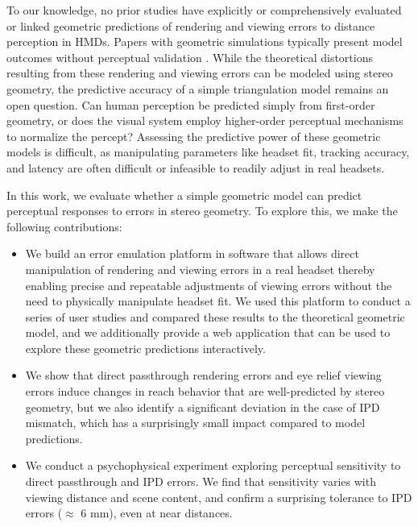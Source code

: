 To our knowledge, no prior studies have explicitly or comprehensively evaluated or linked geometric
predictions of rendering and viewing errors to distance perception in HMDs. Papers with geometric simulations typically present model outcomes without perceptual validation \cite{held2008misperceptions, robinett92, woods93}. While the theoretical distortions resulting from these rendering and viewing errors can be modeled using stereo geometry, the predictive accuracy of a simple triangulation model remains an open question. Can human perception be predicted simply from first-order geometry, or does the visual system employ higher-order perceptual mechanisms to normalize the percept? Assessing the predictive power of these geometric models is difficult, as manipulating parameters like headset fit, tracking accuracy, and latency are often difficult or infeasible to readily adjust in real headsets. 

In this work, we evaluate whether a simple geometric model can predict perceptual responses to errors in stereo geometry. To explore this, we make the following contributions:

\begin{itemize}   
    \item We build an error emulation platform in software that allows direct manipulation of rendering and viewing errors in a real headset thereby enabling precise and repeatable adjustments of viewing errors without the need to physically manipulate headset fit. We used this platform to conduct a series of user studies and compared these results to the theoretical geometric model, and we additionally provide a web application that can be used to explore these geometric predictions interactively.

    \item  We show that direct passthrough rendering errors and eye relief viewing errors induce changes in reach behavior that are well-predicted by stereo geometry, but we also identify a significant deviation in the case of IPD mismatch, which has a surprisingly small impact compared to model predictions.
    
    \item We conduct a psychophysical experiment exploring perceptual sensitivity to direct passthrough and IPD errors. We find that sensitivity varies with viewing distance and scene content, and confirm a surprising tolerance to IPD errors ($\approx$ 6 mm), even at near distances.
    
    
\end{itemize}


